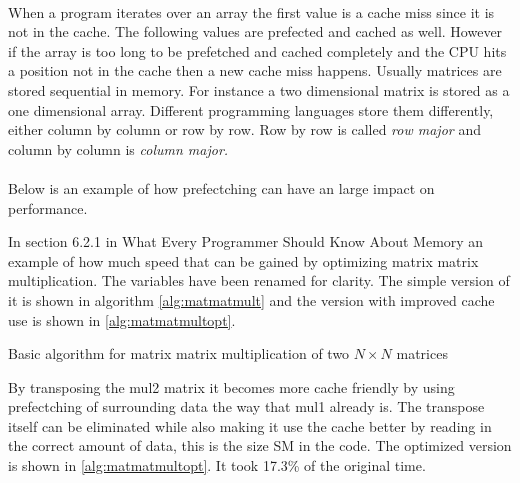 \documentclass[10pt,a4paper]{report}
\begin{document}
\\
When a program iterates over an array the first value is a cache miss since it is not in the cache. The following values are prefected and cached as well. However if the array is too long to be prefetched and cached completely and the CPU hits a position not in the cache then a new cache miss happens\cite{drepper2007cpumemory}. Usually matrices are stored sequential in memory\cite{drepper2007cpumemory}. For instance a two dimensional matrix is stored as a one dimensional array. Different programming languages store them differently, either column by column or row by row\cite{drepper2007cpumemory}. Row by row is called \emph{row major} and column by column is \emph{column major.}\\
\\
Below is an example of how prefectching can have an large impact on performance. 

In section 6.2.1 in What Every Programmer Should Know About Memory\cite{drepper2007cpumemory} an example of how much speed that can be gained by optimizing matrix matrix multiplication. The variables have been renamed for clarity. The simple version of it is shown in algorithm \ref{alg:matmatmult} and the version with improved cache use is shown in \ref{alg:matmatmultopt}.

\begin{algorithm}
\DontPrintSemicolon
\SetStartEndCondition{ (}{)}{)}\SetAlgoBlockMarkers{\{}{\}}%
%
%
%
%
%
\AlgoDisplayBlockMarkers\SetAlgoNoLine%

\BlankLine \BlankLine


\BlankLine \BlankLine
{}

\caption{Basic algorithm for matrix matrix multiplication of two $N \times N$ matrices}
\label{alg:matmatmult}
\end{algorithm}

By transposing the mul2 matrix it becomes more cache friendly by using prefectching of surrounding data the way that mul1 already is\cite{drepper2007cpumemory}. The transpose itself can be eliminated while also making it use the cache better by reading in the correct amount of data, this is the size SM in the code\cite{drepper2007cpumemory}. The optimized version is shown in \ref{alg:matmatmultopt}. It took 17.3\% of the original time\cite{drepper2007cpumemory}.
\end{document}
